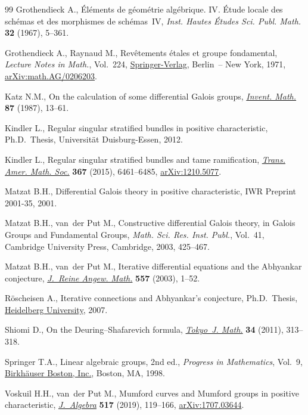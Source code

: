 \documentclass[pdftex]{sigma}
\numberwithin{equation}{section}
\begin{document}
\begin{thebibliography}{99}
Grothendieck A., \'El\'ements de g\'eom\'etrie alg\'ebrique. {IV}. \'Etude
 locale des sch\'emas et des morphismes de sch\'emas~{IV}, \textit{Inst.
 Hautes \'Etudes Sci. Publ. Math.} \textbf{32} (1967), 5--361.

Grothendieck A., Raynaud M., Rev\^etements \'etales et groupe fondamental,
 \textit{Lecture Notes in Math.}, Vol.~224, \href{http://dx.doi.org/10.1007/BFb0058656}{Springer-Verlag}, Berlin~-- New
 York, 1971, \href{https://arxiv.org/abs/math.AG/0206203}{arXiv:math.AG/0206203}.

Katz N.M., On the calculation of some differential {G}alois groups,
 \href{https://doi.org/10.1007/BF01389152}{\textit{Invent. Math.}} \textbf{87} (1987), 13--61.

Kindler L., Regular singular stratified bundles in positive characteristic,
 Ph.D.~Thesis, Universit\"at Duisburg-Essen, 2012.

Kindler L., Regular singular stratified bundles and tame ramification,
 \href{https://doi.org/10.1090/S0002-9947-2014-06143-6}{\textit{Trans. Amer. Math. Soc.}} \textbf{367} (2015), 6461--6485,
 \href{https://arxiv.org/abs/1210.5077}{arXiv:1210.5077}.

Matzat B.H., Differential {G}alois theory in positive characteristic, {IWR}
 Preprint 2001-35, 2001.

Matzat B.H., van~der Put M., Constructive differential {G}alois theory, in
 Galois Groups and Fundamental Groups, \textit{Math. Sci. Res. Inst. Publ.},
 Vol.~41, Cambridge University Press, Cambridge, 2003, 425--467.

Matzat B.H., van~der Put M., Iterative differential equations and the
 {A}bhyankar conjecture, \href{https://doi.org/10.1515/crll.2003.032}{\textit{J.~Reine Angew. Math.}} \textbf{557} (2003),
 1--52.

R\"oscheisen A., Iterative connections and {A}bhyankar's conjecture, Ph.D.~Thesis, \href{https://doi.org/10.11588/heidok.00007179}{Heidelberg University}, 2007.

Shiomi D., On the {D}euring--{S}hafarevich formula, \href{https://doi.org/10.3836/tjm/1327931387}{\textit{Tokyo~J. Math.}}
 \textbf{34} (2011), 313--318.

Springer T.A., Linear algebraic groups, 2nd ed., \textit{Progress in Mathematics},
 Vol.~9, \href{https://doi.org/10.1007/978-0-8176-4840-4}{Birkh\"{a}user Boston, Inc.}, Boston, MA, 1998.

Voskuil H.H., van~der Put M., Mumford curves and {M}umford groups in positive
 characteristic, \href{https://doi.org/10.1016/j.jalgebra.2018.09.036}{\textit{J.~Algebra}} \textbf{517} (2019), 119--166,
 \href{https://arxiv.org/abs/1707.03644}{arXiv:1707.03644}.

\end{thebibliography}\LastPageEnding
\end{document}
